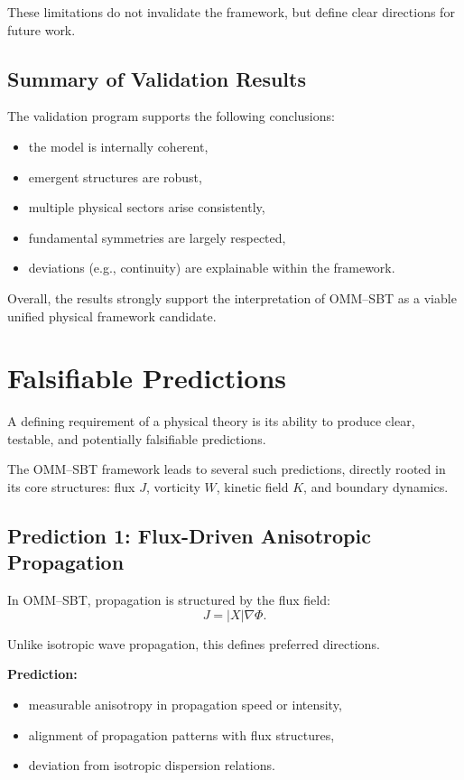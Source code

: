 \documentclass[11pt]{article}
\begin{document}
These limitations do not invalidate the framework, but define clear directions for future work.

\subsection{Summary of Validation Results}

The validation program supports the following conclusions:

\begin{itemize}
\item the model is internally coherent,
\item emergent structures are robust,
\item multiple physical sectors arise consistently,
\item fundamental symmetries are largely respected,
\item deviations (e.g., continuity) are explainable within the framework.
\end{itemize}

Overall, the results strongly support the interpretation of OMM--SBT as a viable unified physical framework candidate.

\section{Falsifiable Predictions}

A defining requirement of a physical theory is its ability to produce clear, testable, and potentially falsifiable predictions.

The OMM--SBT framework leads to several such predictions, directly rooted in its core structures: flux $J$, vorticity $W$, kinetic field $K$, and boundary dynamics.

\subsection{Prediction 1: Flux-Driven Anisotropic Propagation}

In OMM--SBT, propagation is structured by the flux field:
\begin{equation}
J = |X| \nabla \Phi.
\end{equation}

Unlike isotropic wave propagation, this defines preferred directions.

\textbf{Prediction:}
\begin{itemize}
\item measurable anisotropy in propagation speed or intensity,
\item alignment of propagation patterns with flux structures,
\item deviation from isotropic dispersion relations.
\end{itemize}
\end{document}
